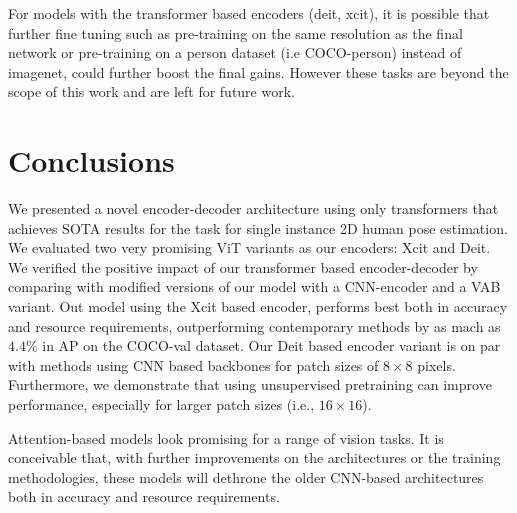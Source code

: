 \documentclass[runningheads]{llncs}
\begin{document}
For models with the transformer based encoders (deit, xcit), it is possible that further fine tuning such as pre-training on the same resolution as the final network or pre-training on a person dataset (i.e COCO-person) instead of imagenet, could further boost the final gains. 
However these tasks are beyond the scope of this work and are left for future work.

\section{Conclusions}
We presented a novel encoder-decoder architecture using only transformers that achieves SOTA results for the task for single instance 2D human pose estimation. We evaluated two very promising ViT variants as our encoders: Xcit and Deit. We verified the positive impact of our transformer based encoder-decoder by comparing with modified versions of our model with a CNN-encoder and a VAB variant.
Out model using the Xcit based encoder, performs best both in accuracy and resource requirements, outperforming contemporary methods by as mach as $4.4\%$ in AP on the COCO-val dataset.
Our Deit based encoder variant is on par with methods using CNN based backbones for patch sizes of $8 \times 8$ pixels.
Furthermore, we demonstrate that using unsupervised pretraining can improve performance, especially for larger patch sizes (i.e., $16 \times 16$). 

Attention-based models look promising for a range of vision tasks.
It is conceivable that, with further improvements on the architectures or 
the training methodologies, these models will dethrone the older CNN-based 
architectures both in accuracy and resource requirements.



\end{document}
